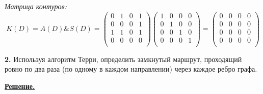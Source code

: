 \documentclass[12pt, letterpaper, titlepage]{article}
\begin{document}
\emph{Матрица контуров:}
\begin{equation*}
    K(D)=A(D) \& S(D) = 
    \begin{pmatrix}
        0 & 1 & 0 & 1\\
        0 & 0 & 0 & 1\\
        1 & 1 & 0 & 1\\
        0 & 0 & 0 & 0\\
    \end{pmatrix}
    \begin{pmatrix}
        1 & 0 & 0 & 0\\
        0 & 1 & 0 & 0\\
        0 & 0 & 1 & 0\\
        0 & 0 & 0 & 1\\
    \end{pmatrix}
    =
    \begin{pmatrix}
        0 & 0 & 0 & 0\\
        0 & 0 & 0 & 0\\
        0 & 0 & 0 & 0\\
        0 & 0 & 0 & 0\\
    \end{pmatrix}
\end{equation*}

\textbf{2.} Используя алгоритм Терри, определить замкнутый маршрут, проходящий ровно по два раза
(по одному в каждом направлении) через каждое ребро графа.
\begin{center}\end{center}
\underline{\textbf{Решение.}}
\end{document}
